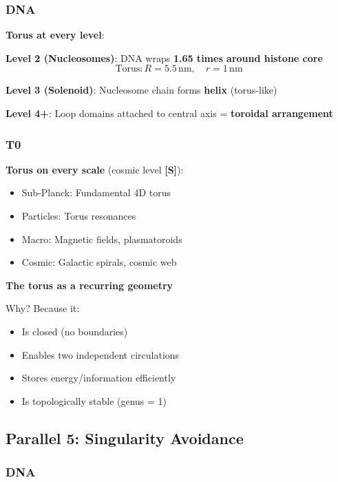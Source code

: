 	\subsubsection{DNA}

	\textbf{Torus at every level}:

	\textbf{Level 2 (Nucleosomes)}: DNA wraps \textbf{1.65 times around histone core}
	\begin{equation}
		\text{Torus}: R = 5.5\,\text{nm}, \quad r = 1\,\text{nm}
	\end{equation}

	\textbf{Level 3 (Solenoid)}: Nucleosome chain forms \textbf{helix} (torus-like)

	\textbf{Level 4+}: Loop domains attached to central axis = \textbf{toroidal arrangement}

	\subsubsection{T0}

	\textbf{Torus on every scale} (cosmic level \textbf{[S]}):
	\begin{itemize}
		\item Sub-Planck: Fundamental 4D torus
		\item Particles: Torus resonances
		\item Macro: Magnetic fields, plasmatoroids
		\item Cosmic: Galactic spirals, cosmic web
	\end{itemize}

	\begin{keyresult}
		\textbf{The torus as a recurring geometry}

		Why? Because it:
		\begin{itemize}
			\item Is closed (no boundaries)
			\item Enables two independent circulations
			\item Stores energy/information efficiently
			\item Is topologically stable (genus = 1)
		\end{itemize}
	\end{keyresult}

	\subsection{Parallel 5: Singularity Avoidance}

	\subsubsection{DNA}

